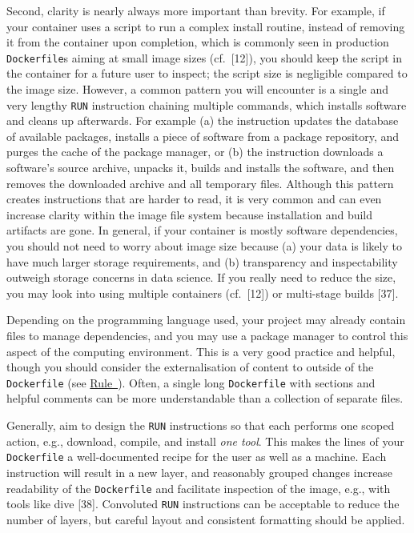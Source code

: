 \documentclass[10pt,letterpaper]{article}
\begin{document}
Second, clarity is nearly always more important than brevity. For
example, if your container uses a script to run a complex install
routine, instead of removing it from the container upon completion,
which is commonly seen in production \texttt{Dockerfile}s aiming at
small image sizes (cf.~{[}12{]}), you should keep the script in the
container for a future user to inspect; the script size is negligible
compared to the image size. However, a common pattern you will encounter
is a single and very lengthy \texttt{RUN} instruction chaining multiple
commands, which installs software and cleans up afterwards. For example
(a) the instruction updates the database of available packages, installs
a piece of software from a package repository, and purges the cache of
the package manager, or (b) the instruction downloads a software's
source archive, unpacks it, builds and installs the software, and then
removes the downloaded archive and all temporary files. Although this
pattern creates instructions that are harder to read, it is very common
and can even increase clarity within the image file system because
installation and build artifacts are gone. In general, if your container
is mostly software dependencies, you should not need to worry about
image size because (a) your data is likely to have much larger storage
requirements, and (b) transparency and inspectability outweigh storage
concerns in data science. If you really need to reduce the size, you may
look into using multiple containers (cf.~{[}12{]}) or multi-stage builds
{[}37{]}.

Depending on the programming language used, your project may already
contain files to manage dependencies, and you may use a package manager
to control this aspect of the computing environment. This is a very good
practice and helpful, though you should consider the externalisation of
content to outside of the \texttt{Dockerfile} (see
\hyperref[{rule:mount}]{Rule~}). Often, a single
long \texttt{Dockerfile} with sections and helpful comments can be more
understandable than a collection of separate files.

Generally, aim to design the \texttt{RUN} instructions so that each
performs one scoped action, e.g., download, compile, and install
\emph{one tool}. This makes the lines of your \texttt{Dockerfile} a
well-documented recipe for the user as well as a machine. Each
instruction will result in a new layer, and reasonably grouped changes
increase readability of the \texttt{Dockerfile} and facilitate
inspection of the image, e.g., with tools like dive {[}38{]}. Convoluted
\texttt{RUN} instructions can be acceptable to reduce the number of
layers, but careful layout and consistent formatting should be applied.
\end{document}
